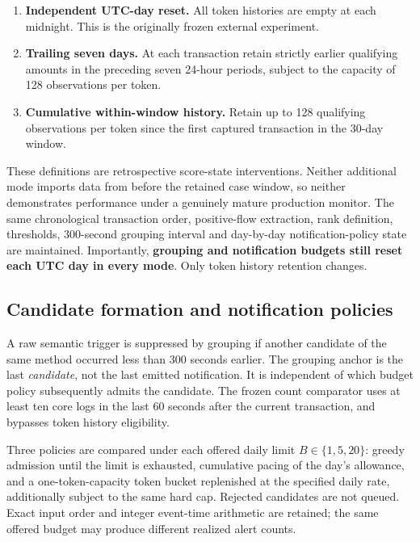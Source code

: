 \documentclass[preprint,12pt,authoryear]{elsarticle}
\providecommand{\tightlist}{\setlength{\itemsep}{0pt}\setlength{\parskip}{0pt}}
\begin{document}
\begin{enumerate}
\def\labelenumi{\arabic{enumi}.}
\tightlist
\item
  \textbf{Independent UTC-day reset.} All token histories are empty at each midnight. This is the originally frozen external experiment.
\item
  \textbf{Trailing seven days.} At each transaction retain strictly earlier qualifying amounts in the preceding seven 24-hour periods, subject to the capacity of 128 observations per token.
\item
  \textbf{Cumulative within-window history.} Retain up to 128 qualifying observations per token since the first captured transaction in the 30-day window.
\end{enumerate}

These definitions are retrospective score-state interventions. Neither additional mode imports data from before the retained case window, so neither demonstrates performance under a genuinely mature production monitor. The same chronological transaction order, positive-flow extraction, rank definition, thresholds, 300-second grouping interval and day-by-day notification-policy state are maintained. Importantly, \textbf{grouping and notification budgets still reset each UTC day in every mode}. Only token history retention changes.

\subsection{Candidate formation and notification policies}\label{candidate-formation-and-notification-policies}

A raw semantic trigger is suppressed by grouping if another candidate of the same method occurred less than 300 seconds earlier. The grouping anchor is the last \emph{candidate}, not the last emitted notification. It is independent of which budget policy subsequently admits the candidate. The frozen count comparator uses at least ten core logs in the last 60 seconds after the current transaction, and bypasses token history eligibility.

Three policies are compared under each offered daily limit \(B\in\{1,5,20\}\): greedy admission until the limit is exhausted, cumulative pacing of the day's allowance, and a one-token-capacity token bucket replenished at the specified daily rate, additionally subject to the same hard cap. Rejected candidates are not queued. Exact input order and integer event-time arithmetic are retained; the same offered budget may produce different realized alert counts.
\end{document}

